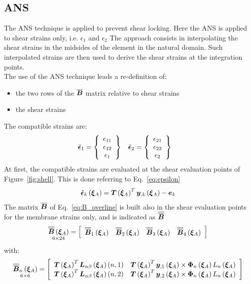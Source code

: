 \subsection{ANS}
The ANS technique is applied to prevent shear locking. Here the ANS is applied to shear strains only, i.e. $\epsilon_{1}$ and  $\epsilon_{2}$ The approach consists in interpolating the shear strains in the midsides of the element in the natural domain. Such interpolated strains are then used to derive the shear strains at the integration points.\\
The use of the ANS technique leads a re-definition of:
\begin{itemize}
	\item the two rows of the $\overline{\T{B}}$ matrix relative to shear strains
	\item the shear strains
\end{itemize}
The compatible strains are:
\begin{align}
\tilde{\T{\epsilon}}_1 & =
\cubr{\vvect{c}{
\epsilon_{11} \\
\epsilon_{12} \\
\epsilon_{1}
}}
&
\tilde{\T{\epsilon}}_2 & =
\cubr{\vvect{c}{
\epsilon_{21} \\
\epsilon_{22} \\
\epsilon_{2}
}}
\end{align}
At first, the compatible strains are evaluated at the shear evaluation points of Figure~\ref{fig:shell}. This is done referring to Eq.~\ref{eq:epsilon}
\begin{equation}
\tilde{\T{\epsilon}}_k \valxiA  =
\T{T} \valxiA ^T \T{y}_{,k} \valxiA - \T{e}_k
\end{equation}
The matrix $\overline{\T{B}}$ of Eq.~\ref{eq:B_overline} is built also in the shear evaluation points for the membrane strains only, and is indicated as $\overline{\overline{\T{B}}}$
\begin{equation}
\underset{ 6 \times 24 }{\overline{\overline{\T{B}}} \valxiA} =
\sqbr{ \matr{ c c c c  }{
\overline{\overline{\T{B}}}_1 \valxiA & \overline{\overline{\T{B}}}_2 \valxiA & \overline{\overline{\T{B}}}_3 \valxiA & \overline{\overline{\T{B}}}_4 \valxiA
}}
\end{equation}
with:
\begin{equation}
\underset{ 6 \times 6 }{\overline{\overline{\T{B}}}_n \valxiA} =
\sqbr{ \matr{ c c  }{
\T{T} \valxiA ^ T \T{L}_{\alpha \beta} \valxiA \plbr{n,1} & \T{T} \valxiA^T \T{y}_{,1} \valxiA \times \T{\Phi}_{n} \valxiA L_{n}  \valxiA \\
\T{T} \valxiA ^ T \T{L}_{\alpha \beta} \valxiA \plbr{n,2} & \T{T} \valxiA^T \T{y}_{,2} \valxiA \times \T{\Phi}_{n} \valxiA L_{n}  \valxiA
}}
\end{equation}
